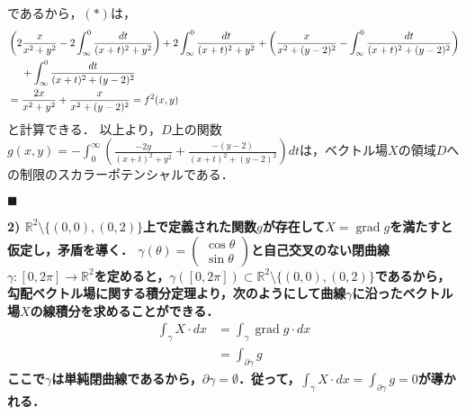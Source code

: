 \documentclass[dvipdfmx,a4paper,uplatex]{jsarticle}
\DeclareMathOperator{\grad}{\mathrm{grad}}
\begin{document}
であるから，$(\ast)$は，
\begin{align*}
    &\left( 2\frac{x}{x^2+y^2}-2\int^0_\infty\frac{dt}{(x+t)^2+y^2} \right) + 2\int^0_\infty\frac{dt}{(x+t)^2+y^2}+\left( \frac{x}{x^2+(y-2)^2} - \int^0_\infty\frac{dt}{(x+t)^2+(y-2)^2} \right)\\*
    &\hphantom{{}={}}+ \int^0_\infty\frac{dt}{(x+t)^2+(y-2)^2} \\
    &= \frac{2x}{x^2+y^2}+\frac{x}{x^2+(y-2)^2}=f^2(x,y)
\end{align*}
と計算できる．
以上より，$D$上の関数$g(x,y)=-\int^\infty_0 \left( \frac{-2y}{(x+t)^2+y^2} + \frac{-(y-2)}{(x+t)^2+(y-2)^2} \right)dt$は，ベクトル場$X$の領域$D$への制限のスカラーポテンシャルである．
\begin{flushright}
    $\blacksquare$
\end{flushright}





\bf{2)} $\mathbb{R}^2\setminus\{(0,0),(0,2)\}$上で定義された関数$g$が存在して$X=\grad g$を満たすと仮定し，矛盾を導く．
$\gamma(\theta)=\begin{pmatrix}\cos\theta\\\sin\theta\end{pmatrix}$と自己交叉のない閉曲線$\gamma:[0,2\pi]\to \mathbb{R}^2$を定めると，$\gamma([0,2\pi])\subset\mathbb{R}^2\setminus\{(0,0),(0,2)\}$であるから，勾配ベクトル場に関する積分定理より，次のようにして曲線$\gamma$に沿ったベクトル場$X$の線積分を求めることができる．
\begin{align*}
    \int_\gamma X\cdot dx &= \int_\gamma\grad g\cdot dx \\
    &= \int_{\partial\gamma}g
\end{align*}
ここで$\gamma$は単純閉曲線であるから，$\partial\gamma=\emptyset$．従って，$\int_\gamma X\cdot dx=\int_{\partial\gamma}g=0$が導かれる．
\end{document}
